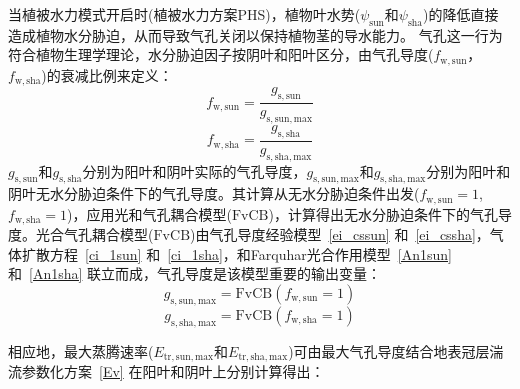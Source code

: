 当植被水力模式开启时(植被水力方案PHS)，植物叶水势($\psi_{\mathrm{sun}}$和$\psi_{\mathrm{sha}}$)的降低直接造成植物水分胁迫，从而导致气孔关闭以保持植物茎的导水能力。
气孔这一行为符合植物生理学理论，水分胁迫因子按阴叶和阳叶区分，由气孔导度($f_{\mathrm{w,sun}}$，$f_{\mathrm{w,sha}}$)的衰减比例来定义：
\begin{equation}\label{beta_sun}
  f_{\mathrm{w,sun}}=\frac{g_{\mathrm{s,sun}}}{g_{\mathrm{s,sun,max}}}
\end{equation}
\begin{equation}\label{beta_sha}
  f_{\mathrm{w,sha}}=\frac{g_{\mathrm{s,sha}}}{g_{\mathrm{s,sha,max}}}
\end{equation}
$g_{\mathrm{s,sun}}$和$g_{\mathrm{s,sha}}$分别为阳叶和阴叶实际的气孔导度，$g_{\mathrm{s,sun,max}}$和$g_{\mathrm{s,sha,max}}$分别为阳叶和阴叶无水分胁迫条件下的气孔导度。其计算从无水分胁迫条件出发($f_{\mathrm{w,sun}}=1$, $f_{\mathrm{w,sha}}=1$)，应用光和气孔耦合模型(${\mathrm {FvCB}}$)，计算得出无水分胁迫条件下的气孔导度。光合气孔耦合模型(${\mathrm {FvCB}}$)由气孔导度经验模型~\eqref{ei_cssun} 和~\eqref{ei_cssha}，气体扩散方程~\eqref{ci_1sun} 和~\eqref{ci_1sha}，和Farquhar光合作用模型~\eqref{An1sun} 和~\eqref{An1sha} 联立而成，气孔导度是该模型重要的输出变量：
\begin{equation}\label{gs_sunmax}
  g_{\mathrm{s,sun,max}}=\text{FvCB}\left(f_{\mathrm{w,sun}}=1\right)
\end{equation}
\begin{equation}\label{gs_shamax}
  g_{\mathrm{s,sha,max}}=\text{FvCB}\left(f_{\mathrm{w,sha}}=1\right)
\end{equation}


相应地，最大蒸腾速率($E_{\mathrm{tr,sun,max}}$和$E_{\mathrm{tr,sha,max}}$)可由最大气孔导度结合地表冠层湍流参数化方案~\eqref{Ev} 在阳叶和阴叶上分别计算得出：

